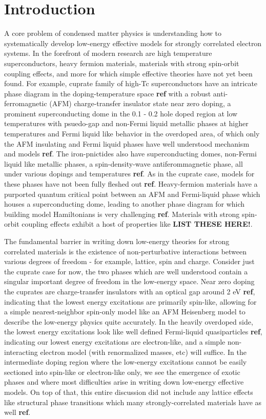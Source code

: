 \documentclass{article}
\begin{document}
\section{Introduction}
A core problem of condensed matter physics is understanding how to systematically develop low-energy effective models for strongly correlated electron systems. In the forefront of modern research are high temperature superconductors, heavy fermion materials, materials with strong spin-orbit coupling effects, and more for which simple effective theories have not yet been found. For example, cuprate family of high-Tc superconductors have an intricate phase diagram in the doping-temperature space \textbf{ref} with a robust anti-ferromagnetic (AFM) charge-transfer insulator state near zero doping, a prominent superconducting dome in the 0.1 - 0.2 hole doped region at low temperatures with psuedo-gap and non-Fermi liquid metallic phases at higher temperatures and Fermi liquid like behavior in the overdoped area, of which only the AFM insulating and Fermi liquid phases have well understood mechanism and models \textbf{ref}. The iron-pnictides also have superconducting domes, non-Fermi liquid like metallic phases, a spin-density-wave antiferommagnetic phase, all under various dopings and temperatures \textbf{ref}. As in the cuprate case, models for these phases have not been fully fleshed out \textbf{ref}. Heavy-fermion materials have a purported quantum critical point between an AFM and Fermi-liquid phase which houses a superconducting dome, leading to another phase diagram for which building model Hamiltonians is very challenging \textbf{ref}. Materials with strong spin-orbit coupling effects exhibit a host of properties like \textbf{LIST THESE HERE!}. 

The fundamental barrier in writing down low-energy theories for strong correlated materials is the existence of non-perturbative interactions between various degrees of freedom - for example, lattice, spin and charge. Consider just the cuprate case for now, the two phases which are well understood contain a singular important degree of freedom in the low-energy space. Near zero doping the cuprates are charge-transfer insulators with an optical gap around 2 eV \textbf{ref}, indicating that the lowest energy excitations are primarily spin-like, allowing for a simple nearest-neighbor spin-only model like an AFM Heisenberg model to describe the low-energy physics quite accurately. In the heavily overdoped side, the lowest energy excitations look like well defined Fermi-liquid quasiparticles \textbf{ref}, indicating our lowest energy excitations are electron-like, and a simple non-interacting electron model (with renormalized masses, etc) will suffice. In the intermediate doping region where the low-energy excitations cannot be easily sectioned into spin-like or electron-like only, we see the emergence of exotic phases and where most difficulties arise in writing down low-energy effective models. On top of that, this entire discussion did not include any lattice effects like structural phase transitions which many strongly-correlated materials have as well \textbf{ref}.
\end{document}
